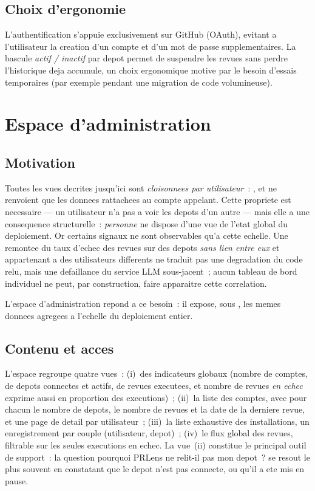 \documentclass[a4paper,12pt,oneside]{report}
\begin{document}
\subsection{Choix d'ergonomie}

L'authentification s'appuie exclusivement sur GitHub (OAuth), evitant a l'utilisateur la creation d'un compte et d'un mot de passe supplementaires. La bascule \emph{actif / inactif} par depot permet de suspendre les revues sans perdre l'historique deja accumule, un choix ergonomique motive par le besoin d'essais temporaires (par exemple pendant une migration de code volumineuse).

\section{Espace d'administration}
\label{sec:admin}

\subsection{Motivation}

Toutes les vues decrites jusqu'ici sont \emph{cloisonnees par utilisateur}~: ,  et  ne renvoient que les donnees rattachees au compte appelant. Cette propriete est necessaire --- un utilisateur n'a pas a voir les depots d'un autre --- mais elle a une consequence structurelle~: \emph{personne} ne dispose d'une vue de l'etat global du deploiement. Or certains signaux ne sont observables qu'a cette echelle. Une remontee du taux d'echec des revues sur des depots \emph{sans lien entre eux} et appartenant a des utilisateurs differents ne traduit pas une degradation du code relu, mais une defaillance du service LLM sous-jacent~; aucun tableau de bord individuel ne peut, par construction, faire apparaitre cette correlation.

L'espace d'administration repond a ce besoin~: il expose, sous , les memes donnees agregees a l'echelle du deploiement entier.

\subsection{Contenu et acces}

L'espace regroupe quatre vues~: (i)~des indicateurs globaux (nombre de comptes, de depots connectes et actifs, de revues executees, et nombre de revues \emph{en echec} exprime aussi en proportion des executions)~; (ii)~la liste des comptes, avec pour chacun le nombre de depots, le nombre de revues et la date de la derniere revue, et une page de detail par utilisateur~; (iii)~la liste exhaustive des installations, un enregistrement par couple (utilisateur, depot)~; (iv)~le flux global des revues, filtrable sur les seules executions en echec. La vue~(ii) constitue le principal outil de support~: la question \og pourquoi PRLens ne relit-il pas mon depot~? \fg{} se resout le plus souvent en constatant que le depot n'est pas connecte, ou qu'il a ete mis en pause.
\end{document}
